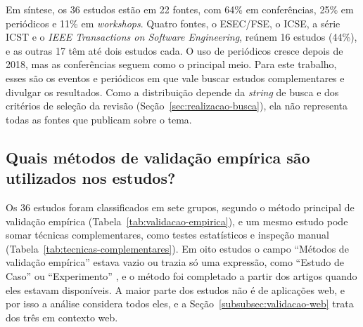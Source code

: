 Em síntese, os 36 estudos estão em 22 fontes, com 64\% em conferências, 25\% em periódicos e 11\% em \textit{workshops}. Quatro fontes, o ESEC/FSE, o ICSE, a série ICST e o \textit{IEEE Transactions on Software Engineering}, reúnem 16 estudos (44\%), e as outras 17 têm até dois estudos cada. O uso de periódicos cresce depois de 2018, mas as conferências seguem como o principal meio. Para este trabalho, esses são os eventos e periódicos em que vale buscar estudos complementares e divulgar os resultados. Como a distribuição depende da \textit{string} de busca e dos critérios de seleção da revisão (Seção~\ref{sec:realizacao-busca}), ela não representa todas as fontes que publicam sobre o tema.


\subsection{Quais métodos de validação empírica são utilizados nos estudos?}
\label{subsec:metodos-validacao}

Os 36 estudos foram classificados em sete grupos, segundo o método principal de validação empírica (Tabela~\ref{tab:validacao-empirica}), e um mesmo estudo pode somar técnicas complementares, como testes estatísticos e inspeção manual (Tabela~\ref{tab:tecnicas-complementares}). Em oito estudos o campo ``Métodos de validação empírica'' estava vazio ou trazia só uma expressão, como ``Estudo de Caso'' ou ``Experimento'' \cite{just2012, kintis2010, tufano2020, ahmed2016, alenezi2016, zhang2022, ashong2025, ashong2026}, e o método foi completado a partir dos artigos quando eles estavam disponíveis. A maior parte dos estudos não é de aplicações web, e por isso a análise considera todos eles, e a Seção~\ref{subsubsec:validacao-web} trata dos três em contexto web.

